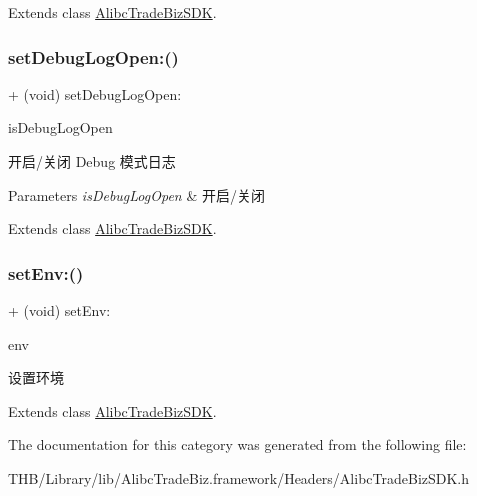 Extends class \mbox{\hyperlink{interface_alibc_trade_biz_s_d_k_ade9e15def0980530603b5f9370de7725}{Alibc\+Trade\+Biz\+S\+DK}}.

\mbox{\label{category_alibc_trade_biz_s_d_k_07_settings_08_a6f1e1ff2c21b052128dcc6cf3350a3e6}} 
\subsubsection{\texorpdfstring{set\+Debug\+Log\+Open\+:()}{setDebugLogOpen:()}}
{\footnotesize\ttfamily + (void) set\+Debug\+Log\+Open\+: \begin{DoxyParamCaption}\item[{(B\+O\+OL)}]{is\+Debug\+Log\+Open }\end{DoxyParamCaption}}

开启/关闭 Debug 模式日志


\begin{DoxyParams}{Parameters}
{\em is\+Debug\+Log\+Open} & 开启/关闭 \\
\hline
\end{DoxyParams}


Extends class \mbox{\hyperlink{interface_alibc_trade_biz_s_d_k_a6f1e1ff2c21b052128dcc6cf3350a3e6}{Alibc\+Trade\+Biz\+S\+DK}}.

\mbox{\label{category_alibc_trade_biz_s_d_k_07_settings_08_a41090673f57d4176b8b448a31b5abb28}} 
\subsubsection{\texorpdfstring{set\+Env\+:()}{setEnv:()}}
{\footnotesize\ttfamily + (void) set\+Env\+: \begin{DoxyParamCaption}\item[{(Alibc\+Environment)}]{env }\end{DoxyParamCaption}}

设置环境 

Extends class \mbox{\hyperlink{interface_alibc_trade_biz_s_d_k_a41090673f57d4176b8b448a31b5abb28}{Alibc\+Trade\+Biz\+S\+DK}}.



The documentation for this category was generated from the following file\+:\begin{DoxyCompactItemize}
\item 
T\+H\+B/\+Library/lib/\+Alibc\+Trade\+Biz.\+framework/\+Headers/Alibc\+Trade\+Biz\+S\+D\+K.\+h\end{DoxyCompactItemize}
